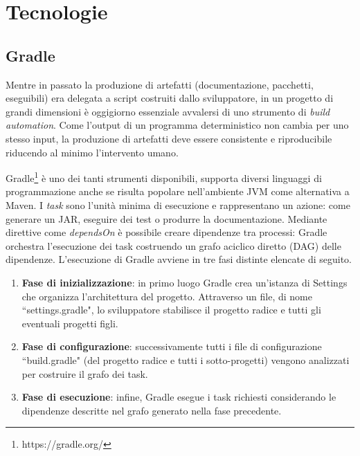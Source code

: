 \section{Tecnologie}\label{sec:technologies}

\subsection{Gradle}

Mentre in passato la produzione di artefatti (documentazione, pacchetti, eseguibili) era delegata a script costruiti dallo sviluppatore, in un progetto di grandi dimensioni è oggigiorno essenziale avvalersi di uno strumento di \textit{build automation}. Come l'output di un programma deterministico non cambia per uno stesso input, la produzione di artefatti deve essere consistente e riproducibile riducendo al minimo l'intervento umano. 

Gradle\footnote{https://gradle.org/} è uno dei tanti strumenti disponibili, supporta diversi linguaggi di programmazione anche se risulta popolare nell'ambiente JVM come alternativa a Maven. I \textit{task} sono l'unità minima di esecuzione e rappresentano un azione: come generare un JAR, eseguire dei test o produrre la documentazione. Mediante direttive come \textit{dependsOn} è possibile creare dipendenze tra processi: Gradle orchestra l'esecuzione dei task costruendo un grafo aciclico diretto (DAG) delle dipendenze. L'esecuzione di Gradle avviene in tre fasi distinte elencate di seguito.
\begin{enumerate}
	\item \textbf{Fase di inizializzazione}: in primo luogo Gradle crea un'istanza di Settings che organizza l'architettura del progetto. Attraverso un file, di nome ``settings.gradle", lo sviluppatore stabilisce il progetto radice e tutti gli eventuali progetti figli. 
	\item \textbf{Fase di configurazione}: successivamente tutti i file di configurazione ``build\-.\-gradle" (del progetto radice e tutti i sotto-progetti) vengono analizzati per costruire il grafo dei task.
	\item \textbf{Fase di esecuzione}: infine, Gradle esegue i task richiesti considerando le dipendenze descritte nel grafo generato nella fase precedente.
\end{enumerate}


